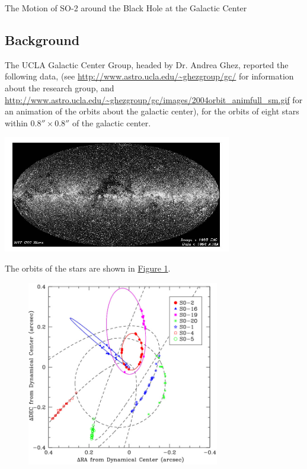 \documentclass{esg8012pset}
\begin{document}
\begin{problem}{The Motion of SO-2 around the Black Hole at the Galactic Center}
  \subsection{Background}
    The UCLA Galactic Center Group, headed by Dr. Andrea Ghez, reported the following data, (see \url{http://www.astro.ucla.edu/\~ghezgroup/gc/} for information about the research group, and \url{http://www.astro.ucla.edu/\~ghezgroup/gc/images/2004orbit_animfull_sm.gif} for an animation of the orbits about the galactic center), for the orbits of eight stars within $0.8'' \times 0.8''$ of the galactic center.
    \begin{center}\includegraphics[width=0.75\textwidth]{ps10_3}\end{center}
    The orbits of the stars are shown in \hyperref[fig:orbits]{Figure 1}.
    
    \begin{figure}[!h] \label{fig:orbits}
      \begin{center}\includegraphics[width=0.75\textwidth]{ps10_4}\end{center}
    \end{figure}
    

\end{problem}
\end{document}
